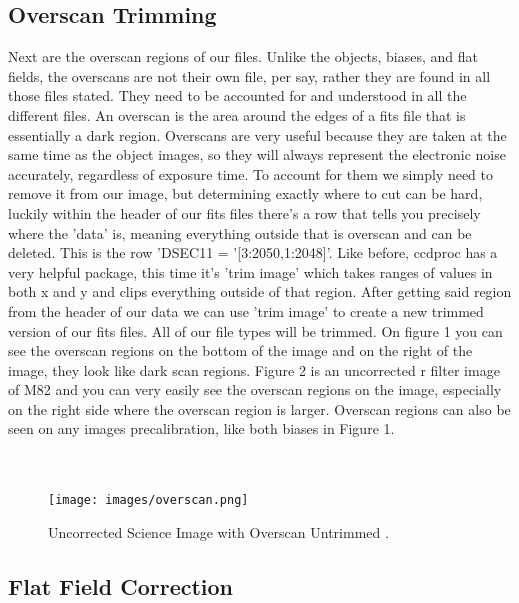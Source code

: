 \documentclass[modern]{aastex63}
\begin{document}
\subsection{Overscan Trimming}
Next are the overscan regions of our files. Unlike the objects, biases, and flat fields, the overscans are not their own file, per say, rather they are found in all those files stated. They need to be accounted for and understood in all the different files. An overscan is the area around the edges of a fits file that is essentially a dark region. Overscans are very useful because they are taken at the same time as the object images, so they will always represent the electronic noise accurately, regardless of exposure time. To account for them we simply need to remove it from our image, but determining exactly where to cut can be hard, luckily within the header of our fits files there's a row that tells you precisely where the 'data' is, meaning everything outside that is overscan and can be deleted. This is the row 'DSEC11  = '[3:2050,1:2048]'. Like before, ccdproc has a very helpful package, this time it's 'trim image' which takes ranges of values in both x and y and clips everything outside of that region. After getting said region from the header of our data we can use 'trim image' to create a new trimmed version of our fits files. All of our file types will be trimmed. On figure 1 you can see the overscan regions on the bottom of the image and on the right of the image, they look like dark scan regions. Figure 2 is an uncorrected r filter image of M82 and you can very easily see the overscan regions on the image, especially on the right side where the overscan region is larger. Overscan regions can also be seen on any images precalibration, like both biases in Figure 1. \\
\\
\\

\begin{figure}
\centering
\texttt{[image: images/overscan.png]}
\caption{\label{fig:frog}Uncorrected Science Image with Overscan Untrimmed .}
\end{figure}

\subsection{Flat Field Correction}
\end{document}
